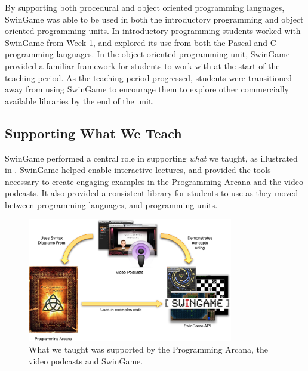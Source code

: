 By supporting both procedural and object oriented programming languages, SwinGame was able to be used in both the introductory programming and object oriented programming units. In introductory programming students worked with SwinGame from Week 1, and explored its use from both the Pascal and C programming languages. In the object oriented programming unit, SwinGame provided a familiar framework for students to work with at the start of the teaching period. As the teaching period progressed, students were transitioned away from using SwinGame to encourage them to explore other commercially available libraries by the end of the unit.

\subsection{Supporting What We Teach} %
\label{sub:supporting_what_we_teach}

SwinGame performed a central role in supporting \emph{what} we taught, as illustrated in . SwinGame helped enable interactive lectures, and provided the tools necessary to create engaging examples in the Programming Arcana and the video podcasts. It also provided a consistent library for students to use as they moved between programming languages, and programming units.

\begin{figure}[thb]
  \centering
  \includegraphics[width=0.8\textwidth]{SupportWhatWeTeach}
  \caption{What we taught was supported by the Programming Arcana, the video podcasts and SwinGame.}
  \label{fig:what_we_teach}
\end{figure}




